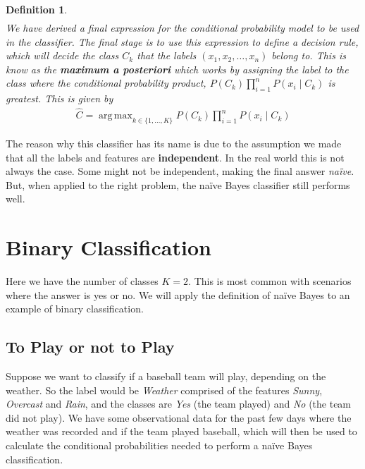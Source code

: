 \documentclass[12pt,twoside]{report}   %
\newcommand{\bb}{\textbf}
\newcommand{\ti}{\textit}
\DeclareMathOperator*{\argmax}{arg\,max}
\newtheorem{definition}[theorem]{Definition}
\begin{document}
\begin{definition}
\begin{align}
\end{align}
We have derived a final expression for the conditional probability model to be used in the classifier. The final stage is to use this expression to define a decision rule, which will decide the class $C_k$ that the labels $(x_1,x_2,\ldots,x_n)$ belong to. This is know as the \bb{maximum a posteriori} which works by assigning the label to the class where the conditional probability product, $P(C_k)\prod^n_{i=1}P(x_i\mid C_k)$ is greatest. This is given by
\begin{align*}
\hat{C} = \argmax_{k\in\{1,\ldots,K\}}P(C_k)\prod^n_{i=1}P(x_i\mid C_k)
\end{align*}
\end{definition}

The reason why this classifier has its name is due to the assumption we made that all the labels and features are \bb{independent}. In the real world this is not always the case. Some might not be independent, making the final answer \ti{na\"{i}ve}. But, when applied to the right problem, the na\"{i}ve Bayes classifier still performs well.

\section{Binary Classification}\label{Binary Classification}
\vspace{-0.4in}
\underline{\hspace{6.2in}}
\vspace{-0.1in}

Here we have the number of classes $K = 2$. This is most common with scenarios where the answer is yes or no. We will apply the definition of na\"{i}ve Bayes to an example of binary classification.

\subsection{To Play or not to Play}\label{play example}
\vspace{-0.35in}
\underline{\hspace{6.2in}}
\vspace{-0.1in}

Suppose we want to classify if a baseball team will play, depending on the weather. So the label would be \ti{Weather} comprised of the features \ti{Sunny}, \ti{Overcast} and \ti{Rain}, and the classes are \ti{Yes} (the team played) and \ti{No} (the team did not play). We have some observational data for the past few days where the weather was recorded and if the team played baseball, which will then be used to calculate the conditional probabilities needed to perform a na\"{i}ve Bayes classification.
\end{document}
